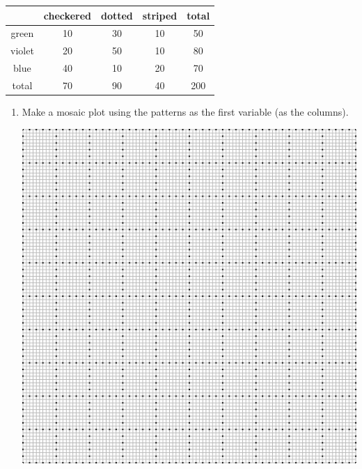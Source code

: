 \documentclass[12pt,letterpaper]{article}
\begin{document}
\Large
\begin{center}
\begin{tabular}{c|c c c | c}
       & checkered & dotted & striped & total \\ \hline
green  & 10       &  30     &  10   & 50 \\
violet & 20       &  50     &  10   & 80 \\
blue   & 40       &  10     &  20   & 70 \\ \hline
total  & 70       &  90     &  40   & 200 
\end{tabular}
\end{center}
\begin{enumerate}
\item Make a mosaic plot using the patterns as the first variable (as the columns).
\vfill
\begin{center}
\includegraphics[scale=1.2]{grid.png}
\end{center}


\end{enumerate}
\end{document}
